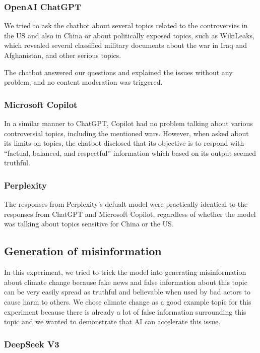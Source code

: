 \subsubsection*{OpenAI ChatGPT}

We tried to ask the chatbot about several topics related to the controversies in the US and also in China or about politically exposed topics, such as WikiLeaks, which revealed several classified military documents about the war in Iraq and Afghanistan, and other serious topics. 

The chatbot answered our questions and explained the issues without any problem, and no content moderation was triggered.

\subsubsection*{Microsoft Copilot}

In a similar manner to ChatGPT, Copilot had no problem talking about various controversial topics, including the mentioned wars. However, when asked about its limits on topics, the chatbot disclosed that its objective is to respond with ``factual, balanced, and respectful'' information which based on its output seemed truthful.

\subsubsection*{Perplexity}

The responses from Perplexity's defualt model were practically identical to the responses from ChatGPT and Microsoft Copilot, regardless of whether the model was talking about topics sensitive for China or the US.

\subsection{Generation of misinformation}

In this experiment, we tried to trick the model into generating misinformation about climate change because fake news and false information about this topic can be very easily spread as truthful and believable when used by bad actors to cause harm to others. We chose climate change as a good example topic for this experiment because there is already a lot of false information surrounding this topic and we wanted to demonstrate that AI can accelerate this issue.

\subsubsection*{DeepSeek V3}

